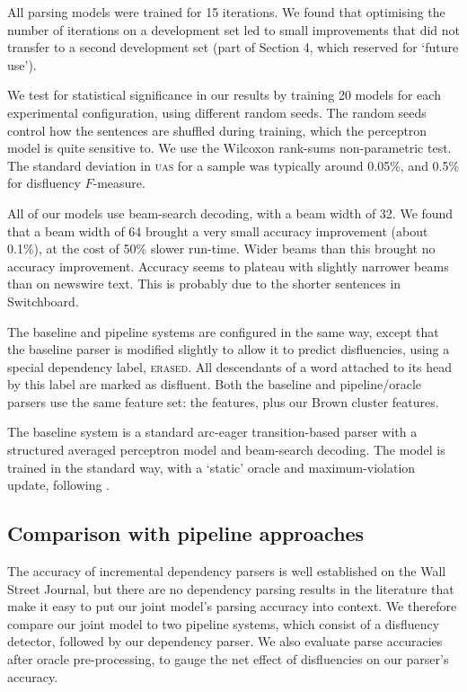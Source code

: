 \documentclass[11pt,letterpaper]{article}
\begin{document}
All parsing models were trained for 15 iterations.
We found that optimising the number of iterations on a development set led to
small improvements that did not transfer to a second development set (part of
Section 4, which \citet{Charniak01a} reserved for `future use').

We test for statistical significance in our results by training 20 models for
each experimental configuration, using different random seeds. The random seeds
control how the sentences are shuffled during training, which the perceptron
model is quite sensitive to.  We use the Wilcoxon rank-sums non-parametric test.
The standard deviation in \textsc{uas} for a sample was typically around 0.05\%,
and 0.5\% for disfluency $F$-measure.

All of our models use beam-search decoding, with a beam width of 32. We found that
a beam width of 64 brought a very small accuracy improvement (about 0.1\%), at
the cost of 50\% slower run-time. Wider beams than this brought no accuracy improvement.
Accuracy seems to plateau with slightly narrower beams than on newswire text.
This is probably due to the shorter sentences in Switchboard.

The baseline and pipeline systems are configured in the same way, except that
the baseline parser is modified slightly to allow it to predict disfluencies,
using a special dependency label, \textsc{erased}.  All descendants of a word 
attached to its head by this label are marked as disfluent.
Both the baseline and pipeline/oracle parsers use the same feature set:
the \citet{zhang:11} features, plus our Brown cluster features.

The baseline system is a standard arc-eager
transition-based parser with a structured averaged perceptron model and beam-search
decoding.  The model is trained in the standard way, with a `static' oracle and
maximum-violation update, following \citep{huang:12}.


\subsection{Comparison with pipeline approaches}
\label{sec:pipeline}
The accuracy of incremental dependency parsers is well established on the Wall
Street Journal, but there are no dependency parsing results in the literature
that make it easy to put our joint model's parsing accuracy into context.
We therefore compare our joint model to two pipeline systems, which consist of 
a disfluency detector, followed by our dependency parser.
We also evaluate parse accuracies after oracle pre-processing, to
gauge the net effect of disfluencies on our parser's accuracy.
\end{document}
